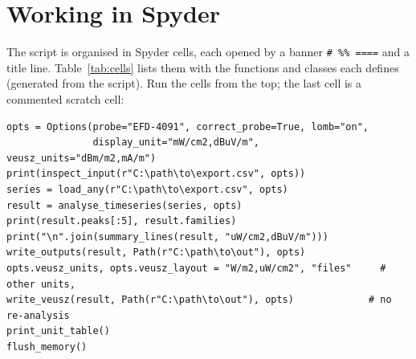\documentclass[10pt,letterpaper]{article}
\numberwithin{equation}{section}
\begin{document}
\section{Working in Spyder}\label{sec:spyder}
The script is organised in Spyder cells, each opened by a banner
\verb|# %% ====| and a title line. Table~\ref{tab:cells} lists them with the
functions and classes each defines (generated from the script). Run the cells
from the top; the last cell is a commented scratch cell:
\begin{Verbatim}
opts = Options(probe="EFD-4091", correct_probe=True, lomb="on",
               display_unit="mW/cm2,dBuV/m", veusz_units="dBm/m2,mA/m")
print(inspect_input(r"C:\path\to\export.csv", opts))
series = load_any(r"C:\path\to\export.csv", opts)
result = analyse_timeseries(series, opts)
print(result.peaks[:5], result.families)
print("\n".join(summary_lines(result, "uW/cm2,dBuV/m")))
write_outputs(result, Path(r"C:\path\to\out"), opts)
opts.veusz_units, opts.veusz_layout = "W/m2,uW/cm2", "files"     # other units,
write_veusz(result, Path(r"C:\path\to\out"), opts)             # no re-analysis
print_unit_table()
flush_memory()
\end{Verbatim}
\end{document}
